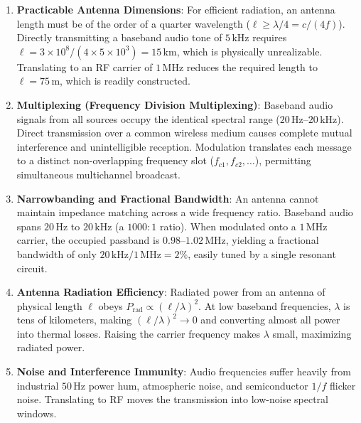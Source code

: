 \documentclass[12pt,a4paper]{article}
\begin{document}
\begin{enumerate}[leftmargin=1.5em, itemsep=3pt]
  \item \textbf{Practicable Antenna Dimensions}: For efficient radiation, an antenna length must be of the order of a quarter wavelength ($\ell \ge \lambda/4 = c/(4f)$). Directly transmitting a baseband audio tone of $5\,\mathrm{kHz}$ requires $\ell = 3\times10^8/(4\times5\times10^3) = 15\,\mathrm{km}$, which is physically unrealizable. Translating to an RF carrier of $1\,\mathrm{MHz}$ reduces the required length to $\ell = 75\,\mathrm{m}$, which is readily constructed.
  \item \textbf{Multiplexing (Frequency Division Multiplexing)}: Baseband audio signals from all sources occupy the identical spectral range ($20\,\mathrm{Hz}$--$20\,\mathrm{kHz}$). Direct transmission over a common wireless medium causes complete mutual interference and unintelligible reception. Modulation translates each message to a distinct non-overlapping frequency slot ($f_{c1}, f_{c2}, \dots$), permitting simultaneous multichannel broadcast.
  \item \textbf{Narrowbanding and Fractional Bandwidth}: An antenna cannot maintain impedance matching across a wide frequency ratio. Baseband audio spans $20\,\mathrm{Hz}$ to $20\,\mathrm{kHz}$ (a $1000:1$ ratio). When modulated onto a $1\,\mathrm{MHz}$ carrier, the occupied passband is $0.98$--$1.02\,\mathrm{MHz}$, yielding a fractional bandwidth of only $20\,\mathrm{kHz}/1\,\mathrm{MHz} = 2\%$, easily tuned by a single resonant circuit.
  \item \textbf{Antenna Radiation Efficiency}: Radiated power from an antenna of physical length $\ell$ obeys $P_{\mathrm{rad}} \propto (\ell/\lambda)^2$. At low baseband frequencies, $\lambda$ is tens of kilometers, making $(\ell/\lambda)^2 \to 0$ and converting almost all power into thermal losses. Raising the carrier frequency makes $\lambda$ small, maximizing radiated power.
  \item \textbf{Noise and Interference Immunity}: Audio frequencies suffer heavily from industrial $50\,\mathrm{Hz}$ power hum, atmospheric noise, and semiconductor $1/f$ flicker noise. Translating to RF moves the transmission into low-noise spectral windows.
\end{enumerate}
\end{document}
